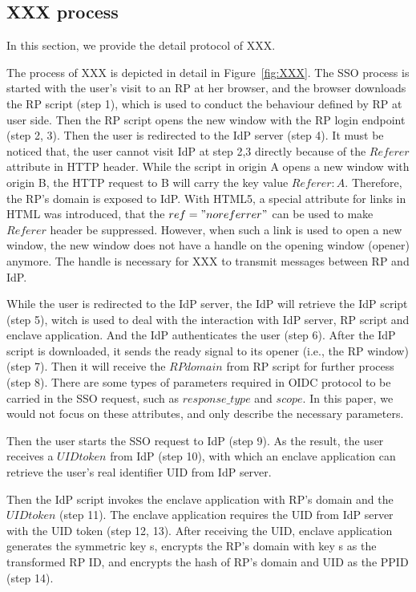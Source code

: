 \subsection{XXX process}
In this section, we provide the detail protocol of XXX.

The process of XXX is depicted in detail in Figure~\ref{fig:XXX}.
The SSO process is started with the user's visit to an RP at her browser, and the browser downloads the RP script (step 1), which is used to conduct the behaviour defined by RP at user side. Then the RP script opens the new window with the RP login endpoint (step 2, 3). Then the user is redirected to the IdP server (step 4). It must be noticed that, the user cannot visit IdP at step 2,3 directly because of the $Referer$ attribute in HTTP header. While the script in origin A opens a new window with origin B, the HTTP request to B will carry the key value $Referer: A$. Therefore, the RP's domain is exposed to IdP. With HTML5, a special attribute for links in HTML was introduced, that the $ref="noreferrer"$ can be used to make $Referer$ header be suppressed. However, when such a link is used to open a new window, the new window does not have a handle on the opening window (opener) anymore. The handle is necessary for XXX to transmit messages between RP and IdP.



While the user is redirected to the IdP server, the IdP will retrieve the IdP script (step 5), witch is used to deal with the interaction with IdP server, RP script and enclave application.
And the IdP authenticates the user (step 6). After the IdP script is downloaded, it sends the ready signal to its opener (i.e., the RP window) (step 7). Then it will receive the $RPdomain$ from RP script for further process (step 8). There are some types of parameters required in OIDC protocol to be carried in the SSO request, such as $response\_type$ and $scope$. In this paper, we would not focus on these attributes, and only describe the necessary parameters. 

Then the user starts the SSO request to IdP (step 9). As the result, the user receives a $UID token$ from IdP (step 10), with which an enclave application can retrieve the user's real identifier UID from IdP server.

Then the IdP script invokes the enclave application with RP's domain and the $UID token$ (step 11). The enclave application requires the UID from IdP server with the UID token (step 12, 13). After receiving the UID, enclave application generates the symmetric key s, encrypts the RP's domain with key s as the transformed RP ID, and encrypts the hash of RP's domain and UID as the PPID (step 14). 

